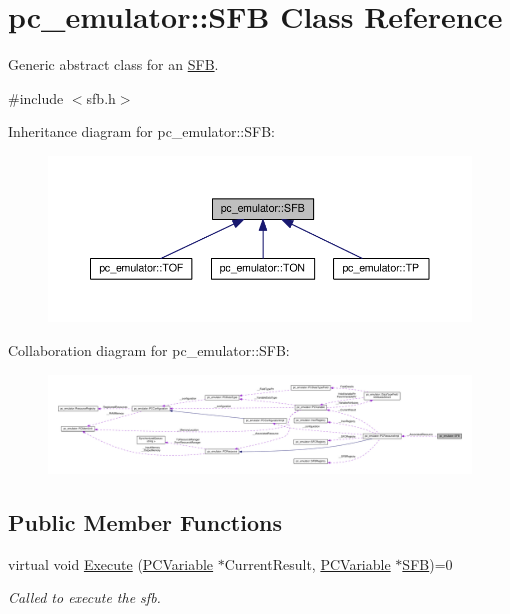 \hypertarget{classpc__emulator_1_1SFB}{}\section{pc\+\_\+emulator\+:\+:S\+FB Class Reference}
\label{classpc__emulator_1_1SFB}


Generic abstract class for an \hyperlink{classpc__emulator_1_1SFB}{S\+FB}.  




{\ttfamily \#include $<$sfb.\+h$>$}



Inheritance diagram for pc\+\_\+emulator\+:\+:S\+FB\+:\nopagebreak
\begin{figure}[H]
\begin{center}
\leavevmode
\includegraphics[width=350pt]{classpc__emulator_1_1SFB__inherit__graph}
\end{center}
\end{figure}


Collaboration diagram for pc\+\_\+emulator\+:\+:S\+FB\+:\nopagebreak
\begin{figure}[H]
\begin{center}
\leavevmode
\includegraphics[width=350pt]{classpc__emulator_1_1SFB__coll__graph}
\end{center}
\end{figure}
\subsection*{Public Member Functions}
\begin{DoxyCompactItemize}
\item 
virtual void \hyperlink{classpc__emulator_1_1SFB_a203227dee0fcab88b8e9d1055c29d958}{Execute} (\hyperlink{classpc__emulator_1_1PCVariable}{P\+C\+Variable} $\ast$Current\+Result, \hyperlink{classpc__emulator_1_1PCVariable}{P\+C\+Variable} $\ast$\hyperlink{classpc__emulator_1_1SFB}{S\+FB})=0
\begin{DoxyCompactList}\small\item\em Called to execute the sfb. \end{DoxyCompactList}\end{DoxyCompactItemize}
